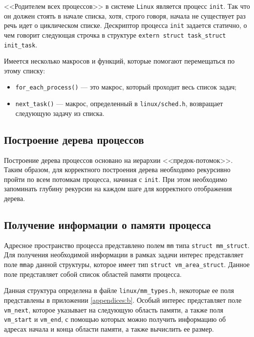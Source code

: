 <<Родителем всех процессов>> в системе \texttt{Linux} является процесс \texttt{init}. Так что он должен стоять в начале списка, хотя, строго говоря, начала не существует раз речь идет о циклическом списке. Дескриптор процесса \texttt{init} задается статично, о чем говорит следующая строчка в структуре \texttt{extern struct task\_struct init\_task}.

Имеется несколько макросов и функций, которые помогают перемещаться по этому списку:

\begin{itemize}
    \item \texttt{for\_each\_process()} --- это макрос, который проходит весь список задач;
    \item \texttt{next\_task()} --- макрос, определенный в \texttt{linux/sched.h}, возвращает 
    следующую задачу из списка.
\end{itemize}


\subsection{Построение дерева процессов}

Построение дерева процессов основано на иерархии <<предок-потомок>>. Таким образом, для корректного построения дерева необходимо рекурсивно пройти по всем потомкам процесса, начиная с \texttt{init}. При этом необходимо запоминать глубину рекурсии на каждом шаге для корректного отображения дерева.


\subsection{Получение информации о памяти процесса}

Адресное пространство процесса представлено полем \texttt{mm} типа \texttt{struct mm\_struct}. Для получения необходимой информации в рамках задачи интерес представляет поле \texttt{mmap} данной структуры, которое имеет тип \texttt{struct vm\_area\_struct}. Данное поле представляет собой список областей памяти процесса.

Данная структура определена в файле \texttt{linux/mm\_types.h}, некоторые ее поля представлены в приложении \ref{appendices:b}. Особый интерес представляет поле \texttt{vm\_next}, которое указывает на следующую область памяти, а также поля \texttt{vm\_start} и \texttt{vm\_end}, с помощью которых можно получить информацию об адресах начала и конца области памяти, а также вычислить ее размер.


